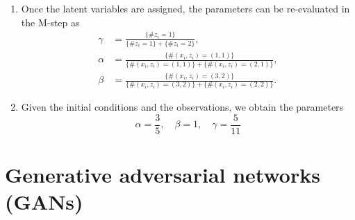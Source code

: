 \documentclass[a4paper, 10pt]{article}
\begin{document}
\begin{enumerate}[label=(\alph*)]
    \item Once the latent variables are assigned, the parameters can be re-evaluated in the M-step as
    \begin{equation}
        \begin{aligned}
            \gamma &= \frac{\{\# z_i = 1\}}{\{\# z_i = 1\} + \{\# z_i = 2\}}, \\
            \alpha &= \frac{\{\# (x_i, z_i) = (1, 1)\}}{\{\# (x_i, z_i) = (1, 1)\} + \{\# (x_i, z_i) = (2, 1)\}}, \\
            \beta &= \frac{\{\# (x_i, z_i) = (3, 2)\}}{\{\# (x_i, z_i) = (3, 2)\} + \{\# (x_i, z_i) = (2, 2)\}}.
        \end{aligned}
    \end{equation}

    \item Given the initial conditions and the observations, we obtain the parameters
    \begin{equation}
        \alpha = \frac{3}{5},\quad \beta = 1,\quad \gamma = \frac{5}{11}
    \end{equation}
\end{enumerate}


\section{Generative adversarial networks (GANs)}
\end{document}
